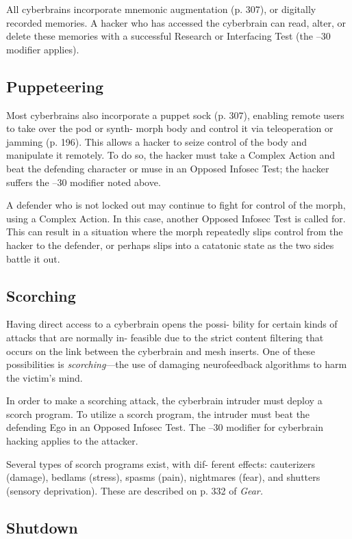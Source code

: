 All cyberbrains incorporate mnemonic augmentation 
(p. 307), or digitally recorded memories. A hacker 
who has accessed the cyberbrain can read, alter, or 
delete these memories with a successful Research or 
Interfacing Test (the –30 modifier applies).

\subsection{Puppeteering}

Most cyberbrains also incorporate a puppet sock (p. 307), 
enabling remote users to take over the pod or synth-
morph body and control it via teleoperation or jamming 
(p. 196). This allows a hacker to seize control of the body 
and manipulate it remotely. To do so, the hacker must 
take a Complex Action and beat the defending character 
or muse in an Opposed Infosec Test; the hacker suffers 
the –30 modifier noted above.

A defender who is not locked out may continue 
to fight for control of the morph, using a Complex 
Action. In this case, another Opposed Infosec Test 
is called for. This can result in a situation where the 
morph repeatedly slips control from the hacker to the 
defender, or perhaps slips into a catatonic state as the 
two sides battle it out.

\subsection{Scorching}

Having direct access to a cyberbrain opens the possi-
bility for certain kinds of attacks that are normally in-
feasible due to the strict content filtering that occurs on 
the link between the cyberbrain and mesh inserts. One 
of these possibilities is \textit{scorching}—the use of damaging 
neurofeedback algorithms to harm the victim's mind.

In order to make a scorching attack, the cyberbrain 
intruder must deploy a scorch program. To utilize a 
scorch program, the intruder must beat the defending 
Ego in an Opposed Infosec Test. The –30 modifier for 
cyberbrain hacking applies to the attacker.

Several types of scorch programs exist, with dif-
ferent effects: cauterizers (damage), bedlams (stress), 
spasms (pain), nightmares (fear), and shutters (sensory 
deprivation). These are described on p. 332 of \textit{Gear.}

\subsection{Shutdown}

